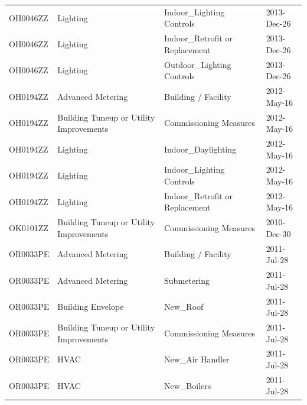 \documentclass[12pt]{article}
\begin{document}
\begin{longtable}{lp{4cm}p{4cm}p{3cm}}
OH0046ZZ         & Lighting                                & Indoor\_Lighting Controls                 & 2013-Dec-26                   \\
OH0046ZZ         & Lighting                                & Indoor\_Retrofit or Replacement           & 2013-Dec-26                   \\
OH0046ZZ         & Lighting                                & Outdoor\_Lighting Controls                & 2013-Dec-26                   \\
OH0194ZZ         & Advanced Metering                       & Building / Facility                       & 2012-May-16                   \\
OH0194ZZ         & Building Tuneup or Utility Improvements & Commissioning Measures                    & 2012-May-16                   \\
OH0194ZZ         & Lighting                                & Indoor\_Daylighting                       & 2012-May-16                   \\
OH0194ZZ         & Lighting                                & Indoor\_Lighting Controls                 & 2012-May-16                   \\
OH0194ZZ         & Lighting                                & Indoor\_Retrofit or Replacement           & 2012-May-16                   \\
OK0101ZZ         & Building Tuneup or Utility Improvements & Commissioning Measures                    & 2010-Dec-30                   \\
OR0033PE         & Advanced Metering                       & Building / Facility                       & 2011-Jul-28                   \\
OR0033PE         & Advanced Metering                       & Submetering                               & 2011-Jul-28                   \\
OR0033PE         & Building Envelope                       & New\_Roof                                 & 2011-Jul-28                   \\
OR0033PE         & Building Tuneup or Utility Improvements & Commissioning Measures                    & 2011-Jul-28                   \\
OR0033PE         & HVAC                                    & New\_Air Handler                          & 2011-Jul-28                   \\
OR0033PE         & HVAC                                    & New\_Boilers                              & 2011-Jul-28                   \\

\end{longtable}
\end{document}
